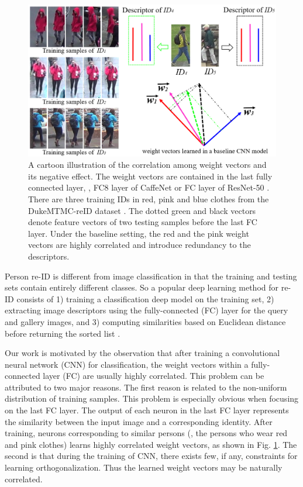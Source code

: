 \documentclass[10pt,twocolumn,letterpaper]{article}
\begin{document}
\begin{figure}[t]
\begin{center}
\includegraphics[width=1.0\linewidth]{projection.PNG}
\end{center}
   \caption{A cartoon illustration of the correlation among weight vectors and its negative effect. The weight vectors are contained in the last fully connected layer, \eg, FC8 layer of CaffeNet \cite{DBLP:conf/nips/KrizhevskySH12} or  FC layer of ResNet-50 \cite{DBLP:conf/cvpr/HeZRS16}. There are three training IDs in red, pink and blue clothes from the DukeMTMC-reID dataset \cite{ristani2016performance}. The dotted green and black vectors denote feature vectors of two testing samples before the last FC layer. Under the baseline setting, the red and the pink weight vectors are highly correlated and introduce redundancy to the descriptors.}
\label{fig:motivation}
\end{figure}
Person re-ID is different from image classification in that the training and testing sets contain entirely different classes. So a popular deep learning method for re-ID consists of 1) training a classification deep model on the training set, 2) extracting image descriptors using the fully-connected (FC) layer for the query and gallery images, and 3) computing similarities based on Euclidean distance before returning the sorted list \cite{DBLP:journals/corr/ZhengYH16,DBLP:journals/corr/ZhengHLY17,DBLP:conf/cvpr/XiaoLOW16,geng2016deep}. 

Our work is motivated by the observation that after training a convolutional neural network (CNN) for classification, the weight vectors within a fully-connected layer (FC) are usually highly correlated. This problem can be attributed to two major reasons. The first reason is related to the non-uniform distribution of training samples. This problem is especially obvious when focusing on the last FC layer. The output of each neuron in the last FC layer represents the similarity between the input image and a corresponding identity. After training, neurons corresponding to similar persons (\ie, the persons who wear red and pink clothes) learns highly correlated weight vectors, as shown in Fig. \ref{fig:motivation}. The second is that during the training of CNN, there exists few, if any, constraints for learning orthogonalization. Thus the learned weight vectors may be naturally correlated.
\end{document}
